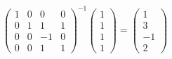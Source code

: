 \documentclass[UTF8,12pt,a4paper,fontset=fandol]{ctexart}
\begin{document}
\begin{solve}
\begin{enumerate}
\[\begin{pmatrix}
                              1 & 0 & 0  & 0 \\
                              0 & 1 & 1  & 1 \\
                              0 & 0 & -1 & 0 \\
                              0 & 0 & 1  & 1
                          \end{pmatrix}^{-1} \begin{pmatrix} 1 \\ 1 \\ 1 \\ 1 \end{pmatrix} = \begin{pmatrix} 1 \\ 3 \\ -1 \\ 2 \end{pmatrix} \]
            \end{enumerate}
\end{solve}
\end{document}
